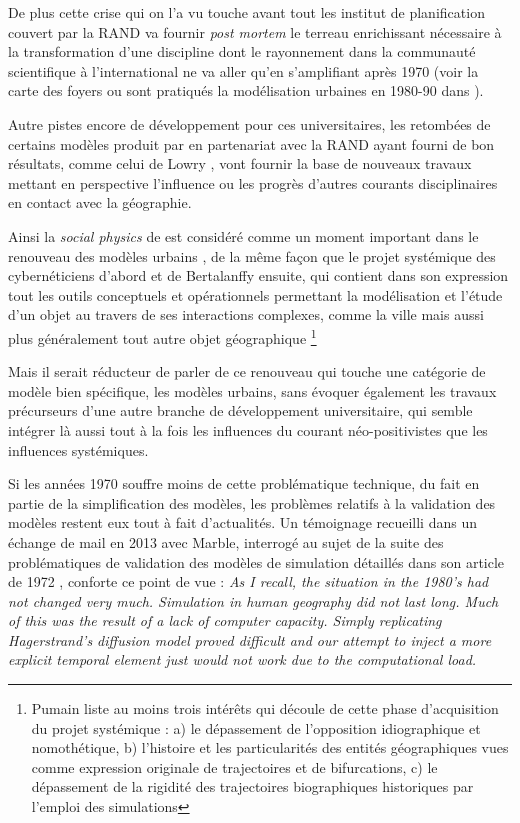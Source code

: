 De plus cette crise qui on l'a vu touche avant tout les institut de planification couvert par la RAND va fournir \textit{post mortem} le terreau enrichissant nécessaire à la transformation d'une discipline dont le rayonnement dans la communauté scientifique à l'international ne va aller qu'en s'amplifiant après 1970 (voir la carte des foyers ou sont pratiqués la modélisation urbaines en 1980-90 dans \autocite{Wegener1994}).

Autre pistes encore de développement pour ces universitaires, les retombées de certains modèles produit par en partenariat avec la RAND ayant fourni de bon résultats, comme celui de Lowry \autocite {Lowry1964}, vont fournir la base de nouveaux travaux mettant en perspective l'influence ou les progrès d'autres courants disciplinaires en contact avec la géographie. 

Ainsi la \textit{social physics} de \autocite{Wilson1970} est considéré comme un moment important dans le renouveau des modèles urbains \autocite{Griffith2010}, de la même façon que le projet systémique des cybernéticiens d'abord et de Bertalanffy ensuite, qui contient dans son expression tout les outils conceptuels et opérationnels permettant la modélisation et l'étude d'un objet au travers de ses interactions complexes, comme la ville \autocite{Forrester1969} \autocite[11]{Batty1976, Batty2001} mais aussi plus généralement tout autre objet géographique \autocite[27-28]{Pumain2003} \footnote{ Pumain liste au moins trois intérêts qui découle de cette phase d'acquisition du projet systémique : a) le dépassement de l'opposition idiographique et nomothétique, b) l'histoire et les particularités des entités géographiques vues comme expression originale de trajectoires et de bifurcations, c) le dépassement de la rigidité des trajectoires biographiques historiques par l'emploi des simulations}

Mais il serait réducteur de parler de ce renouveau qui touche une catégorie de modèle bien spécifique, les modèles urbains, sans évoquer également les travaux précurseurs d'une autre branche de développement universitaire, qui semble intégrer là aussi tout à la fois les influences du courant néo-positivistes que les influences systémiques. %

Si les années 1970 souffre moins de cette problématique technique, du fait en partie de la simplification des modèles, les problèmes relatifs à la validation des modèles restent eux tout à fait d'actualités. Un témoignage recueilli dans un échange de mail en 2013 avec Marble, interrogé au sujet de la suite des problématiques de validation des modèles de simulation détaillés dans son article de 1972 \autocite{Marble1972}, conforte ce point de vue : \textit{As I recall, the situation in the 1980's had not changed very much. Simulation in human geography did not last long. Much of this was the result of a lack of computer capacity. Simply replicating Hagerstrand's diffusion model proved difficult and our attempt to inject a more explicit temporal element just would not work due to the computational load.}

